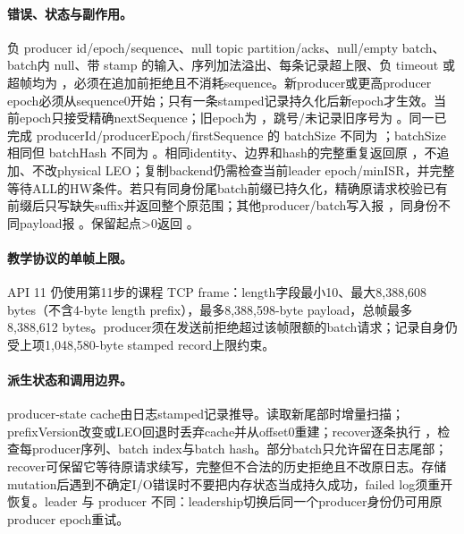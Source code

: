 \paragraph{错误、状态与副作用。}负 producer id/epoch/sequence、null topic partition/acks、null/empty batch、batch内 null、带 stamp 的输入、序列加法溢出、每条记录超上限、负 timeout 或超帧均为 ，必须在追加前拒绝且不消耗sequence。新producer或更高producer epoch必须从sequence0开始；只有一条stamped记录持久化后新epoch才生效。当前epoch只接受精确nextSequence；旧epoch为 ，跳号/未记录旧序号为 。同一已完成 producerId/producerEpoch/firstSequence 的 batchSize 不同为 ；batchSize 相同但 batchHash 不同为 。相同identity、边界和hash的完整重复返回原 \pathcode{[firstOffset,nextOffset)}，不追加、不改physical LEO；复制backend仍需检查当前leader epoch/minISR，并完整等待ALL的HW条件。若只有同身份尾batch前缀已持久化，精确原请求校验已有前缀后只写缺失suffix并返回整个原范围；其他producer/batch写入报 ，同身份不同payload报 。保留起点>0返回 。
\paragraph{教学协议的单帧上限。}API 11 仍使用第11步的课程 TCP frame：length字段最小10、最大8,388,608 bytes（不含4-byte length prefix），最多8,388,598-byte payload，总帧最多8,388,612 bytes。producer须在发送前拒绝超过该帧限额的batch请求；记录自身仍受上项1,048,580-byte stamped record上限约束。
\paragraph{派生状态和调用边界。}producer-state cache由日志stamped记录推导。读取新尾部时增量扫描；prefixVersion改变或LEO回退时丢弃cache并从offset0重建；recover逐条执行 ，检查每producer序列、batch index与batch hash。部分batch只允许留在日志尾部；recover可保留它等待原请求续写，完整但不合法的历史拒绝且不改原日志。存储mutation后遇到不确定I/O错误时不要把内存状态当成持久成功，failed log须重开恢复。leader  与 producer  不同：leadership切换后同一个producer身份仍可用原producer epoch重试。
